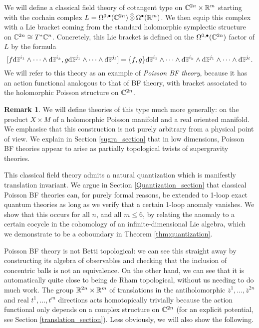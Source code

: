 \documentclass[11pt, oneside, reqno]{amsart}
\theoremstyle{definition} \newtheorem{definition}{Definition}[section]
\theoremstyle{definition}
\theoremstyle{remark}
\theoremstyle{definition} \newtheorem{remark}[definition]{Remark}
\theoremstyle{definition} \newtheorem{remarks}[definition]{Remarks}
\theoremstyle{definition} \newtheorem{question}[definition]{Question}
\theoremstyle{definition} \newtheorem*{note}{Note}
\theoremstyle{definition} \newtheorem{example}[definition]{Example}
\theoremstyle{definition} \newtheorem{examples}[definition]{Examples}
\def\bu{\bullet}
\def\Hat{\widehat}
\newcommand{\iso}{\cong}
\newcommand{\ol}[1]{\overline{#1}}
\def\d{{\rm d}}
\begin{document}
We will define a classical field theory of cotangent type on $\mathbb C^{2n} \times \mathbb R^m$ starting with the cochain complex $L = \Omega^{0,\bu}(\CC^{2n}) \, \Hat{\otimes} \, \Omega^\bu(\RR^m)$.  
We then equip this complex with a Lie bracket coming from the standard holomorphic symplectic structure on $\CC^{2n} \iso T^*\CC^n$.  
Concretely, this Lie bracket is defined on the $\Omega^{0,\bu}(\CC^{2n})$ factor of $L$ by the formula
\[[f \d \ol z^{i_1} \wedge \cdots \wedge \d \ol z^{i_k}, g \d \ol z^{j_1} \wedge \cdots \wedge \d \ol z^{j_\ell}] = \{f,g\} \d \ol z^{i_1} \wedge \cdots \wedge \d \ol z^{i_k} \wedge \d \ol z^{j_1} \wedge \cdots \wedge \d \ol z^{j_\ell}.\]
We will refer to this theory as an example of \emph{Poisson BF theory}, because it has an action functional analogous to that of BF theory, with bracket associated to the holomorphic Poisson structure on $\mathbb C^{2n}$.  

\begin{remark}
We will define theories of this type much more generally: on the product $X \times M$ of a holomorphic Poisson manifold and a real oriented manifold.  We emphasise that this construction is not purely arbitrary from a physical point of view.  We explain in Section \ref{sugra_section} that in low dimensions, Poisson BF theories appear to arise as partially topological twists of supergravity theories.
\end{remark}

This classical field theory admits a natural quantization which is manifestly translation invariant. 
We argue in Section \ref{Quantization_section} that classical Poisson BF theories can, for purely formal reasons, be extended to 1-loop exact quantum theories as long as we verify that a certain 1-loop anomaly vanishes.  We show that this occurs for all $n$, and all $m \le 6$, by relating the anomaly to a certain cocycle in the cohomology of an infinite-dimensional Lie algebra, which we demonstrate to be a coboundary in Theorem \ref{thm:quantization}. 

Poisson BF theory is not Betti topological: we can see this straight away by constructing its algebra of observables and checking that the inclusion of concentric balls is not an equivalence.  On the other hand, we can see that it is automatically quite close to being de Rham topological, without us needing to do much work.  The group $\mathbb R^{2n} \times \mathbb R^m$ of translations in the antiholomorphic $\ol z^1, \ldots, \ol z^{2n}$ and real $t^1, \ldots, t^m$ directions acts homotopically trivially because the action functional only depends on a complex structure on $\mathbb C^{2n}$ (for an explicit potential, see Section \ref{translation_section}).  Less obviously, we will also show the following.
\end{document}

